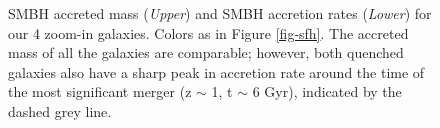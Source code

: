 \documentclass[]{emulateapj}
\begin{document}
\begin{figure}[h!]
\centerline{}
\centerline{} 
\caption[]{SMBH accreted mass (\textit{Upper}) and SMBH accretion rates (\textit{Lower}) for our 4 zoom-in galaxies. Colors as in Figure \ref{fig-sfh}. The accreted mass of all the galaxies are comparable; however, both quenched galaxies also have a sharp peak in accretion rate around the time of the most significant merger (z $\sim$ 1, t $\sim$ 6 Gyr), indicated by the dashed grey line.}
\label{fig-bh}
\end{figure}
\end{document}
